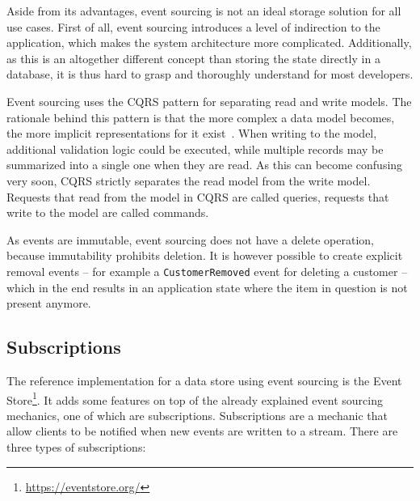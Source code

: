 Aside from its advantages, event sourcing is not an ideal storage solution for all use cases.
First of all, event sourcing introduces a level of indirection to the application, which makes the system architecture more complicated.
Additionally, as this is an altogether different concept than storing the state directly in a database, it is thus hard to grasp and thoroughly understand for most developers.

Event sourcing uses the \acf{CQRS} pattern for separating read and write models.
The rationale behind this pattern is that the more complex a data model becomes, the more implicit representations for it exist~\cite{WEB:Fowler:2011}.
When writing to the model, additional validation logic could be executed, while multiple records may be summarized into a single one when they are read.
As this can become confusing very soon, \ac{CQRS} strictly separates the read model from the write model.
Requests that read from the model in \ac{CQRS} are called queries, requests that write to the model are called commands.


As events are immutable, event sourcing does not have a delete operation, because immutability prohibits deletion.
It is however possible to create explicit removal events -- for example a \texttt{CustomerRemoved} event for deleting a customer -- which in the end results in an application state where the item in question is not present anymore.

\subsection{Subscriptions}

The reference implementation for a data store using event sourcing is the Event Store\footnote{\url{https://eventstore.org/}}.
It adds some features on top of the already explained event sourcing mechanics, one of which are subscriptions.
Subscriptions are a mechanic that allow clients to be notified when new events are written to a stream.
There are three types of subscriptions:

